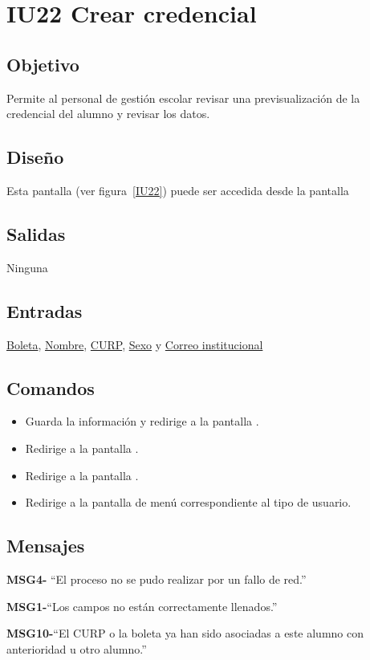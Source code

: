 
\section{IU22 Crear credencial}

\subsection{Objetivo}
   Permite al personal de gestión escolar revisar una previsualización de la credencial del alumno y revisar los datos.
\subsection{Diseño}
    Esta pantalla  (ver figura~\ref{IU22}) puede ser accedida desde la pantalla 


\subsection{Salidas}
Ninguna
\subsection{Entradas}
    \hyperlink{Alumno.Boleta}{Boleta}, \hyperlink{Alumno.Nombre}{Nombre}, \hyperlink{Alumno.CURP}{CURP}, \hyperlink{Alumno.Sexo}{Sexo} y \hyperlink{Alumno.Correo institucional}{Correo institucional}
\subsection{Comandos}
\begin{itemize}
\item {} Guarda la información y redirige a la pantalla .
    \item {} Redirige a la pantalla .
    \item {} Redirige a la pantalla .
    \item {} Redirige a la pantalla de menú correspondiente al tipo de usuario.
    
\end{itemize}

\subsection{Mensajes}

\begin{Citemize}
    \item {\bf MSG4-}  ``El proceso no se pudo realizar por un fallo de red.''
    \item {\bf MSG1-}{``Los campos no están correctamente llenados.''}
    \item {\bf MSG10-}{``El CURP o la boleta ya han sido asociadas a este alumno con anterioridad u otro alumno.''}
\end{Citemize}
